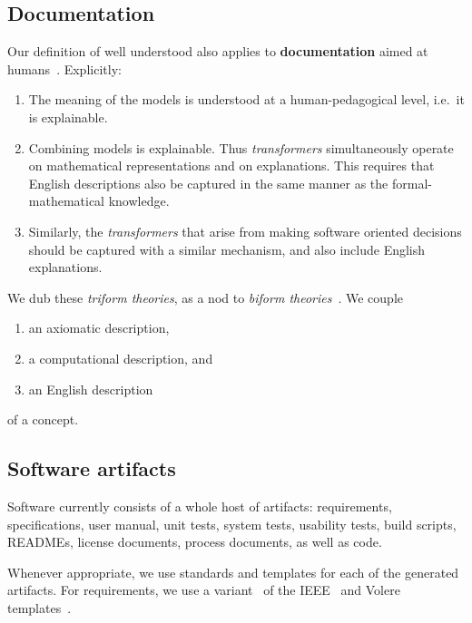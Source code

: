 \documentclass[a4paper,UKenglish,cleveref,autoref,thm-restate]{oasics-v2021}
\begin{document}
\subsection{Documentation}
\label{subsec:documentation}

Our definition of well understood also applies to \textbf{documentation} aimed
at humans~\cite{parnas2011precise}. Explicitly:
\begin{enumerate}
\item The meaning of the models is understood at a human-pedagogical level,
i.e.\ it is explainable.
\item Combining models is explainable. Thus \emph{transformers} simultaneously
operate on mathematical representations and on explanations. This requires that
English descriptions also be captured in the same manner as the
formal-mathematical knowledge.
\item Similarly, the \emph{transformers} that arise from making software
oriented decisions should be captured with a similar mechanism, and also include
English explanations.
\end{enumerate}


We dub these \emph{triform theories}, as a nod to \emph{biform
theories}~\cite{Farmer2007}. We couple 
\begin{enumerate} %
\item an axiomatic description,
\item a computational description, and
\item an English description
\end{enumerate}
of a concept.

\subsection{Software artifacts}
\label{subsec:software-artifacts}

Software currently consists of a whole host of artifacts: requirements,
specifications, user manual, unit tests, system tests, usability tests, build
scripts, READMEs, license documents, process documents, as well as code.

Whenever appropriate, we use standards and templates for each of the generated
artifacts. For requirements, we use a variant~\cite{SmithEtAl2007}
of the IEEE~\cite{IEEE1998} and Volere
templates~\cite{RobertsonAndRobertson1999Vol}.
\end{document}
